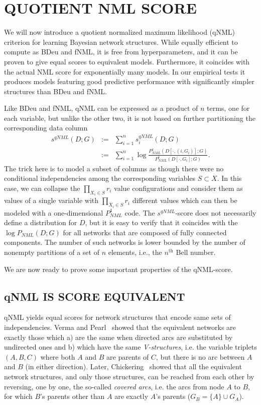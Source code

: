 \section{QUOTIENT NML SCORE}

We will now introduce a quotient normalized maximum likelihood (qNML)
criterion for learning Bayesian network structures.  While equally
efficient to compute as BDeu and fNML, it is free from
hyperparameters, and it can be proven to give equal scores to
equivalent models. Furthermore, it coincides with the actual NML score
for exponentially many models. In our empirical tests it produces
models featuring good predictive performance with significantly
simpler structures than BDeu and fNML.

Like BDeu and fNML, qNML can be expressed as a product of $n$ terms,
one for each variable, but unlike the other two, it is not based on
further partitioning the corresponding data column
\begin{eqnarray}
\label{eqn:qnmldef}
s^{qNML}(D;G) & := & \sum_{i=1}^n s^{qNML}_i(D;G)\\
& := & \sum_{i=1}^n \log \frac{P^1_{NML}(D[\cdot,(i,G_i)];G)}
                             {P^1_{NML}(D[\cdot,G_i];G)}.\nonumber
\end{eqnarray}
The trick here is to model a subset of columns as though there were no
conditional independencies among the corresponding variables $S
\subset X$.  In this case, we can collapse the $\prod_{X_i\in S} r_i$
value configurations and consider them as values of a single variable
with $\prod_{X_i\in S} r_i$ different values which can then be modeled
with a one-dimensional $P^1_{NML}$ code.  The $s^{qNML}$-score does
not necessarily define a distribution for $D$, but it is easy to
verify that it coincides with the $\log P_{NML}(D;G)$ for all networks
that are composed of fully connected components.  The number of such
networks is lower bounded by the number of nonempty partitions of a
set of $n$ elements, i.e., the $n^\text{th}$ Bell number.

We are now ready to prove some important properties of the qNML-score.

\subsection {qNML IS SCORE EQUIVALENT}

qNML yields equal scores for network structures that encode same sets
of independencies. Verma and Pearl~\cite{Verm90} showed that the
equivalent networks are exactly those which a) are the same when directed
arcs are substituted by undirected ones and b) which have the same
\textit{V-structures}, i.e. the variable triplets $(A,B,C)$ where both
$A$ and $B$ are parents of $C$, but there is no arc between $A$ and
$B$ (in either direction).  Later, Chickering~\cite{Chick95} showed
that all the equivalent network structures, and only those structures,
can be reached from each other by reversing, one by one, the so-called
\textit{covered arcs}, i.e. the arcs from node $A$ to $B$, for which
$B$'s parents other than $A$ are exactly  $A$'s parents
($G_B=\{A\}\cup G_A$).


